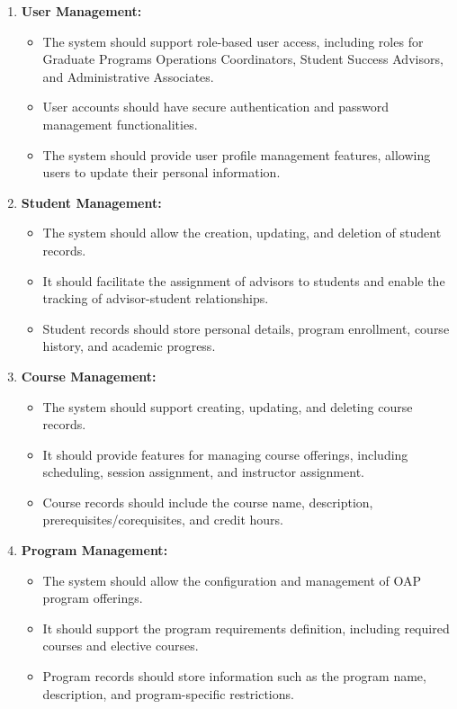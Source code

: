 \documentclass[12pt]{article}
\begin{document}
\begin{enumerate}[label=(\roman*)]
    \item \textbf{User Management:}
    \begin{itemize}
        \item The system should support role-based user access, including roles for Graduate Programs Operations Coordinators, Student Success Advisors, and Administrative Associates.
        \item User accounts should have secure authentication and password management functionalities.
        \item The system should provide user profile management features, allowing users to update their personal information.    
    \end{itemize}
    \item \textbf{Student Management:}
    \begin{itemize}
        \item The system should allow the creation, updating, and deletion of student records.
        \item It should facilitate the assignment of advisors to students and enable the tracking of advisor-student relationships.
        \item Student records should store personal details, program enrollment, course history, and academic progress.
    \end{itemize}
    \item \textbf{Course Management:}
    \begin{itemize}
        \item The system should support creating, updating, and deleting course records.
        \item It should provide features for managing course offerings, including scheduling, session assignment, and instructor assignment.
        \item Course records should include the course name, description, prerequisites/corequisites, and credit hours.
    \end{itemize}
    \item \textbf{Program Management:}
    \begin{itemize}
        \item The system should allow the configuration and management of OAP program offerings.
        \item It should support the program requirements definition, including required courses and elective courses.
        \item Program records should store information such as the program name, description, and program-specific restrictions.

\end{itemize}
\end{enumerate}
\end{document}
